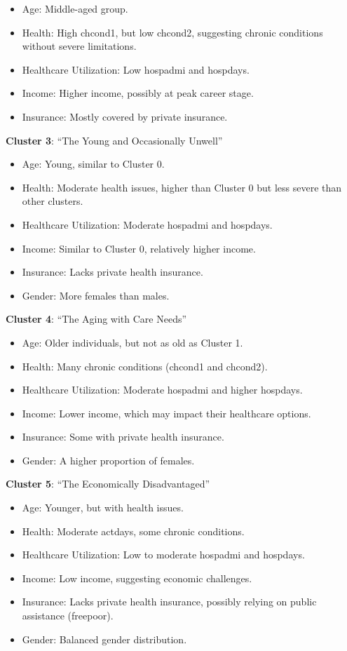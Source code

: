 \documentclass[
]{article}
\providecommand{\tightlist}{%
  \setlength{\itemsep}{0pt}\setlength{\parskip}{0pt}}
\begin{document}
\begin{itemize}
\tightlist
\item
  Age: Middle-aged group.
\item
  Health: High chcond1, but low chcond2, suggesting chronic conditions
  without severe limitations.
\item
  Healthcare Utilization: Low hospadmi and hospdays.
\item
  Income: Higher income, possibly at peak career stage.
\item
  Insurance: Mostly covered by private insurance.
\end{itemize}

\textbf{Cluster 3}: ``The Young and Occasionally Unwell''

\begin{itemize}
\tightlist
\item
  Age: Young, similar to Cluster 0.
\item
  Health: Moderate health issues, higher than Cluster 0 but less severe
  than other clusters.
\item
  Healthcare Utilization: Moderate hospadmi and hospdays.
\item
  Income: Similar to Cluster 0, relatively higher income.
\item
  Insurance: Lacks private health insurance.
\item
  Gender: More females than males.
\end{itemize}

\textbf{Cluster 4}: ``The Aging with Care Needs''

\begin{itemize}
\tightlist
\item
  Age: Older individuals, but not as old as Cluster 1.
\item
  Health: Many chronic conditions (chcond1 and chcond2).
\item
  Healthcare Utilization: Moderate hospadmi and higher hospdays.
\item
  Income: Lower income, which may impact their healthcare options.
\item
  Insurance: Some with private health insurance.
\item
  Gender: A higher proportion of females.
\end{itemize}

\textbf{Cluster 5}: ``The Economically Disadvantaged''

\begin{itemize}
\tightlist
\item
  Age: Younger, but with health issues.
\item
  Health: Moderate actdays, some chronic conditions.
\item
  Healthcare Utilization: Low to moderate hospadmi and hospdays.
\item
  Income: Low income, suggesting economic challenges.
\item
  Insurance: Lacks private health insurance, possibly relying on public
  assistance (freepoor).
\item
  Gender: Balanced gender distribution.
\end{itemize}
\end{document}
